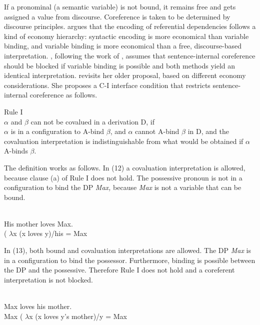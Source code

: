 \documentclass[output=paper]{langsci/langscibook}
\begin{document}
If a pronominal (a semantic variable) is not bound, it remains free and gets assigned a value from discourse. Coreference is taken to be determined by discourse principles. \citet{Reuland2011} argues that the encoding of referential dependencies follows a kind of economy hierarchy: syntactic encoding is more economical than variable binding, and variable binding is more economical than a free, discourse-based interpretation. \citet{Reuland2011}, following the work of \citet{Reinhart1983}, assumes that sentence-internal coreference should be blocked if variable binding is possible and both methods yield an identical interpretation. \citet{Reinhart2006} revisits her older proposal, based on different economy considerations. She proposes a C-I interface condition that restricts sentence-internal coreference as follows.

\ea%
    Rule I \citep[185]{Reinhart2006}\\
$\alpha $ and $\beta $ can not be covalued in a derivation D, if\\\label{ex:wein:11}
    \ea $\alpha $ is in a configuration to A-bind $\beta $, and
    \ex $\alpha $ cannot A-bind $\beta $ in D, and
    \ex the covaluation interpretation is indistinguishable from what would be obtained if $\alpha $ A-binds $\beta $.
    \z
\z

The definition works as follows. In (12) a covaluation interpretation is allowed, because clause (a) of Rule I does not hold. The possessive pronoun is not in a configuration to bind the DP \textit{Max,} because \textit{Max} is not a variable that can be bound.

\ea%
    \citep[186]{Reinhart2006}\\\label{ex:wein:12}
    His mother loves Max.\\ ( $\lambda $x (x loves y)\slash his = Max\\
\z

In (13), both bound and covaluation interpretations are allowed. The DP \textit{Max} is in a configuration to bind the possessor. Furthermore, binding is possible between the DP and the possessive. Therefore Rule I does not hold and a coreferent interpretation is not blocked.

\ea%
    \citep[186]{Reinhart2006}\\\label{ex:wein:13}
    Max loves his mother.\\
    Max ( $\lambda $x (x loves y’s mother)\slash y = Max\\
\z
\end{document}
